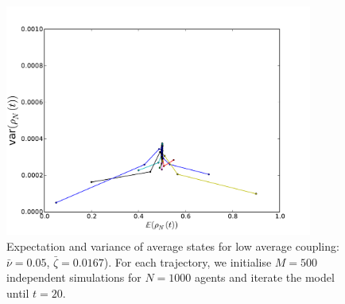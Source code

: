 \documentclass[]{article}
\begin{document}
\begin{figure}
\includegraphics[width=0.9\textwidth]{variance_mean_N1000_M500_mixed_fully_20timesteps.pdf}
\caption{ Expectation and variance of average states for low average coupling: $\bar{\nu}=0.05$, $\bar{\zeta}=0.0167$). For each trajectory, we initialise $M=500$ independent simulations for $N=1000$ agents and iterate the model until $t=20$.}
\label{fig:fig:variance_mean_mixed}
\end{figure}

\newpage{}




\end{document}
